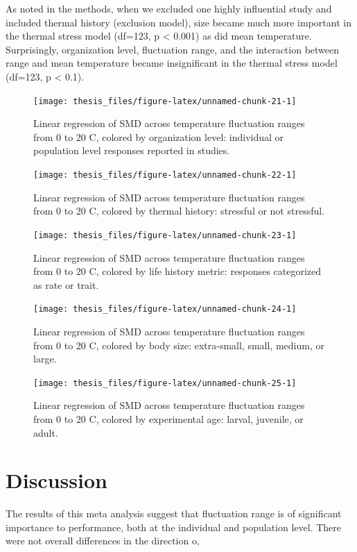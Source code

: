 \documentclass[12pt,twoside]{reedthesis}
\begin{document}
As noted in the methods, when we excluded one highly influential study and included thermal history (exclusion model), size became much more important in the thermal stress model (df=123, p \textless{} 0.001) as did mean temperature. Surprisingly, organization level, fluctuation range, and the interaction between range and mean temperature became insignificant in the thermal stress model (df=123, p \textless{} 0.1).
\begin{figure}
\texttt{[image: thesis\_files/figure-latex/unnamed-chunk-21-1]} \caption{Linear regression of SMD across temperature fluctuation ranges from 0 to 20 C, colored by organization level: individual or population level responses reported in studies.}\label{fig:unnamed-chunk-21}
\end{figure}
\begin{figure}
\texttt{[image: thesis\_files/figure-latex/unnamed-chunk-22-1]} \caption{Linear regression of SMD across temperature fluctuation ranges from 0 to 20 C, colored by thermal history: stressful or not stressful.}\label{fig:unnamed-chunk-22}
\end{figure}
\begin{figure}
\texttt{[image: thesis\_files/figure-latex/unnamed-chunk-23-1]} \caption{Linear regression of SMD across temperature fluctuation ranges from 0 to 20 C, colored by life history metric: responses categorized as rate or trait.}\label{fig:unnamed-chunk-23}
\end{figure}
\begin{figure}
\texttt{[image: thesis\_files/figure-latex/unnamed-chunk-24-1]} \caption{Linear regression of SMD across temperature fluctuation ranges from 0 to 20 C, colored by body size: extra-small, small, medium, or large.}\label{fig:unnamed-chunk-24}
\end{figure}
\begin{figure}
\texttt{[image: thesis\_files/figure-latex/unnamed-chunk-25-1]} \caption{Linear regression of SMD across temperature fluctuation ranges from 0 to 20 C, colored by experimental age: larval, juvenile, or adult.}\label{fig:unnamed-chunk-25}
\end{figure}
\hypertarget{discussion}{%
\chapter*{Discussion}\label{discussion}}

The results of this meta analysis suggest that fluctuation range is of significant importance to performance, both at the individual and population level. There were not overall differences in the direction o,
\end{document}

